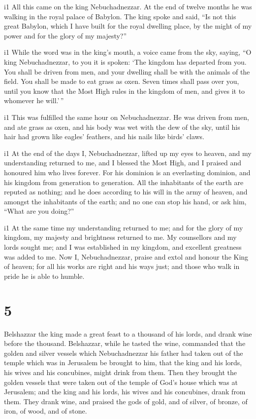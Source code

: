 i1 All this came on the king Nebuchadnezzar. 
At the end of twelve months he was walking in the royal palace of
Babylon.  The king spoke and said, ``Is not this great
Babylon, which I have built for the royal dwelling place, by the might
of my power and for the glory of my majesty?''

i1 While the word was in the king's mouth, a voice came
from the sky, saying, ``O king Nebuchadnezzar, to you it is spoken: `The
kingdom has departed from you.  You shall be driven from
men, and your dwelling shall be with the animals of the field. You shall
be made to eat grass as oxen. Seven times shall pass over you, until you
know that the Most High rules in the kingdom of men, and gives it to
whomever he will.'\,''

i1 This was fulfilled the same hour on Nebuchadnezzar. He
was driven from men, and ate grass as oxen, and his body was wet with
the dew of the sky, until his hair had grown like eagles' feathers, and
his nails like birds' claws.

i1 At the end of the days I, Nebuchadnezzar, lifted up my
eyes to heaven, and my understanding returned to me, and I blessed the
Most High, and I praised and honoured him who lives forever. For his
dominion is an everlasting dominion, and his kingdom from generation to
generation.  All the inhabitants of the earth are reputed
as nothing; and he does according to his will in the army of heaven, and
amongst the inhabitants of the earth; and no one can stop his hand, or
ask him, ``What are you doing?''

i1 At the same time my understanding returned to me; and
for the glory of my kingdom, my majesty and brightness returned to me.
My counsellors and my lords sought me; and I was established in my
kingdom, and excellent greatness was added to me.  Now I,
Nebuchadnezzar, praise and extol and honour the King of heaven; for all
his works are right and his ways just; and those who walk in pride he is
able to humble.

\hypertarget{section-4}{%
\section{5}\label{section-4}}

 Belshazzar the king made a great feast to a thousand of his
lords, and drank wine before the thousand.  Belshazzar,
while he tasted the wine, commanded that the golden and silver vessels
which Nebuchadnezzar his father had taken out of the temple which was in
Jerusalem be brought to him, that the king and his lords, his wives and
his concubines, might drink from them.  Then they brought
the golden vessels that were taken out of the temple of God's house
which was at Jerusalem; and the king and his lords, his wives and his
concubines, drank from them.  They drank wine, and praised
the gods of gold, and of silver, of bronze, of iron, of wood, and of
stone.

